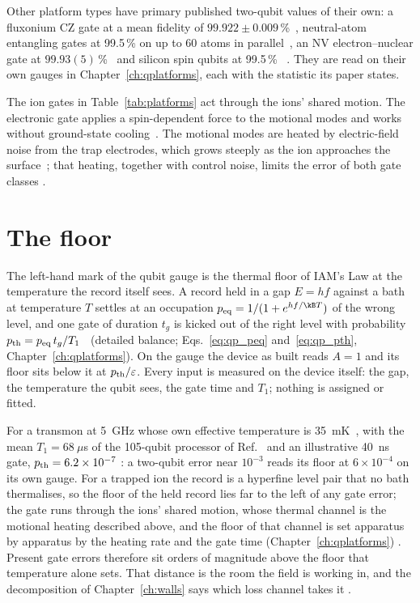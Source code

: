 \noindent Other platform types have primary published two-qubit values of their own: a fluxonium CZ gate at a mean fidelity of
$99.922\pm0.009$\,\%~\cite{Ding2023}, neutral-atom entangling gates at 99.5\,\% on up to 60 atoms in parallel~\cite{Evered2023}, an NV
electron--nuclear gate at $99.93(5)$\,\%~\cite{Bartling2025} and silicon spin qubits at 99.5\,\%~\cite{Xue2022,Noiri2022} \observed. They are read
on their own gauges in Chapter~\ref{ch:qplatforms}, each with the statistic its paper states.

The ion gates in Table~\ref{tab:platforms} act through the ions' shared motion. The electronic gate applies a
spin-dependent force to the motional modes and works without ground-state cooling~\cite{Hughes2025}. The motional
modes are heated by electric-field noise from the trap electrodes, which grows steeply as the ion approaches the
surface~\cite{Brownnutt2015}; that heating, together with control noise, limits the error of both gate classes \observed.

\section{The floor}\label{sec:qubitfloor}

The left-hand mark of the qubit gauge is the thermal floor of IAM's Law at the temperature the record itself sees. A record held in a gap
$E=hf$ against a bath at temperature $T$ settles at an occupation $p_{\rm eq}=1/(1+e^{hf/\kB T})$ of the wrong level, and one gate of
duration $t_g$ is kicked out of the right level with probability $p_{\rm th}=p_{\rm eq}\,t_g/T_1$ \derived\ (detailed balance;
Eqs.~\eqref{eq:qp_peq} and~\eqref{eq:qp_pth}, Chapter~\ref{ch:qplatforms}). On the gauge the device as built reads $A=1$ and its floor sits
below it at $p_{\rm th}/\varepsilon$. Every input is measured on the device itself: the gap, the temperature the qubit sees, the gate time and
$T_1$; nothing is assigned or fitted.

For a transmon at 5~GHz whose own effective temperature is 35~mK~\cite{Jin2015}, with the mean $T_1=68~\mu$s of the 105-qubit processor of
Ref.~\cite{GoogleWillow2025} and an illustrative 40~ns gate, $p_{\rm th}=6.2\times10^{-7}$ \calc: a two-qubit error near $10^{-3}$ reads its
floor at $6\times10^{-4}$ on its own gauge. For a trapped ion the record is a hyperfine level pair that no bath thermalises, so the floor of the
held record lies far to the left of any gate error; the gate runs through the ions' shared motion, whose thermal channel is the motional heating
described above, and the floor of that channel is set apparatus by apparatus by the heating rate and the gate time
(Chapter~\ref{ch:qplatforms}) \interp. Present gate errors therefore sit orders of magnitude above the floor that temperature alone sets. That
distance is the room the field is working in, and the decomposition of Chapter~\ref{ch:walls} says which loss channel takes it \interp.

